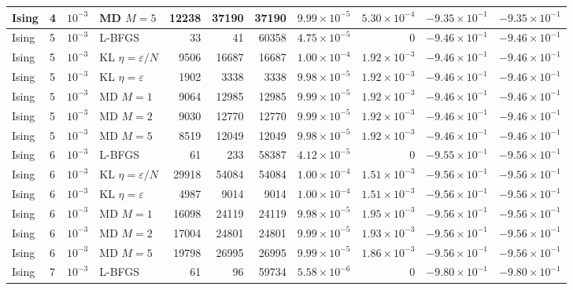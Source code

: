 \begin{table}[t]
\begin{tabular}{llllrrrrrrr}
Ising & 4 & $10^{-3}$ & MD $M=5$ & 12238 & 37190 & 37190 & $9.99\times 10^{-5}$ & $5.30\times 10^{-4}$ & $-9.35\times 10^{-1}$ & $-9.35\times 10^{-1}$ \\
\midrule
Ising & 5 & $10^{-3}$ & L-BFGS & 33 & 41 & 60358 & $4.75\times 10^{-5}$ & 0 & $-9.46\times 10^{-1}$ & $-9.46\times 10^{-1}$ \\
Ising & 5 & $10^{-3}$ & KL $\eta=\varepsilon/N$ & 9506 & 16687 & 16687 & $1.00\times 10^{-4}$ & $1.92\times 10^{-3}$ & $-9.46\times 10^{-1}$ & $-9.46\times 10^{-1}$ \\
Ising & 5 & $10^{-3}$ & KL $\eta=\varepsilon$ & 1902 & 3338 & 3338 & $9.98\times 10^{-5}$ & $1.92\times 10^{-3}$ & $-9.46\times 10^{-1}$ & $-9.46\times 10^{-1}$ \\
Ising & 5 & $10^{-3}$ & MD $M=1$ & 9064 & 12985 & 12985 & $9.99\times 10^{-5}$ & $1.92\times 10^{-3}$ & $-9.46\times 10^{-1}$ & $-9.46\times 10^{-1}$ \\
Ising & 5 & $10^{-3}$ & MD $M=2$ & 9030 & 12770 & 12770 & $9.99\times 10^{-5}$ & $1.92\times 10^{-3}$ & $-9.46\times 10^{-1}$ & $-9.46\times 10^{-1}$ \\
Ising & 5 & $10^{-3}$ & MD $M=5$ & 8519 & 12049 & 12049 & $9.98\times 10^{-5}$ & $1.92\times 10^{-3}$ & $-9.46\times 10^{-1}$ & $-9.46\times 10^{-1}$ \\
\midrule
Ising & 6 & $10^{-3}$ & L-BFGS & 61 & 233 & 58387 & $4.12\times 10^{-5}$ & 0 & $-9.55\times 10^{-1}$ & $-9.56\times 10^{-1}$ \\
Ising & 6 & $10^{-3}$ & KL $\eta=\varepsilon/N$ & 29918 & 54084 & 54084 & $1.00\times 10^{-4}$ & $1.51\times 10^{-3}$ & $-9.56\times 10^{-1}$ & $-9.56\times 10^{-1}$ \\
Ising & 6 & $10^{-3}$ & KL $\eta=\varepsilon$ & 4987 & 9014 & 9014 & $1.00\times 10^{-4}$ & $1.51\times 10^{-3}$ & $-9.56\times 10^{-1}$ & $-9.56\times 10^{-1}$ \\
Ising & 6 & $10^{-3}$ & MD $M=1$ & 16098 & 24119 & 24119 & $9.98\times 10^{-5}$ & $1.95\times 10^{-3}$ & $-9.56\times 10^{-1}$ & $-9.56\times 10^{-1}$ \\
Ising & 6 & $10^{-3}$ & MD $M=2$ & 17004 & 24801 & 24801 & $9.99\times 10^{-5}$ & $1.93\times 10^{-3}$ & $-9.56\times 10^{-1}$ & $-9.56\times 10^{-1}$ \\
Ising & 6 & $10^{-3}$ & MD $M=5$ & 19798 & 26995 & 26995 & $9.99\times 10^{-5}$ & $1.86\times 10^{-3}$ & $-9.56\times 10^{-1}$ & $-9.56\times 10^{-1}$ \\
\midrule
Ising & 7 & $10^{-3}$ & L-BFGS & 61 & 96 & 59734 & $5.58\times 10^{-6}$ & 0 & $-9.80\times 10^{-1}$ & $-9.80\times 10^{-1}$ \\

\end{tabular}
\end{table}
